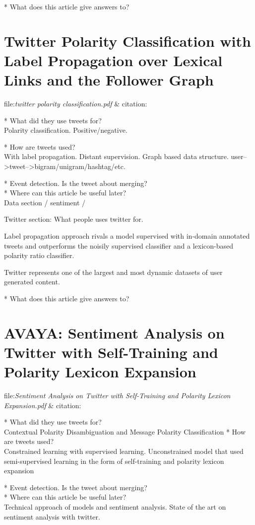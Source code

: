 * What does this article give answers to?\\

\section{Twitter Polarity Classification with Label Propagation over Lexical Links and the Follower Graph}
file:\textit{twitter polarity classification.pdf} & citation:\cite[]{sperious11}

* What did they use tweets for?\\
Polarity classification. Positive/negative. 

* How are tweets used?\\
With label propagation.
Distant supervision. 
Graph based data structure. 
user-->tweet-->bigram/unigram/hashtag/etc.  

* Event detection. Is the tweet about merging? \\
* Where can this article be useful later? \\
Data section / sentiment / 

Twitter section: What people uses twitter for. 

Label propagation approach rivals a model supervised with in-domain annotated tweets and outperforms the noisily supervised classifier and a lexicon-based polarity ratio classifier. \cite[]{sperious11}

Twitter represents one of the largest and most dynamic datasets of user
generated content.


* What does this article give answers to?\\


\section{AVAYA: Sentiment Analysis on Twitter with Self-Training and Polarity Lexicon Expansion}
file:\textit{Sentiment Analysis on Twitter with Self-Training and Polarity
Lexicon Expansion.pdf} & citation:\cite[]{becker13}

* What did they use tweets for?\\
Contextual Polarity Disambiguation and Message Polarity Classiﬁcation
* How are tweets used?\\
Constrained learning with supervised learning. 
Unconstrained model that used semi-supervised learning in the form of self-training and polarity lexicon expansion

* Event detection. Is the tweet about merging? \\
* Where can this article be useful later? \\
Technical approach of models and sentiment analysis.
State of the art on sentiment analysis with twitter. 


